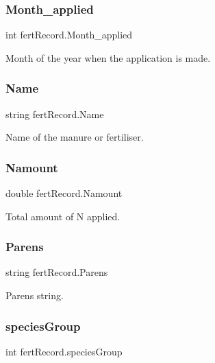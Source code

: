 \subsubsection{\texorpdfstring{Month\_applied}{Month\_applied}}
{\footnotesize\ttfamily int fert\+Record.\+Month\+\_\+applied}

Month of the year when the application is made. \mbox{\label{classfert_record_a04116c39447ca7dba821361c530b23f9}} 
\subsubsection{\texorpdfstring{Name}{Name}}
{\footnotesize\ttfamily string fert\+Record.\+Name}

Name of the manure or fertiliser. \mbox{\label{classfert_record_a60a97d66e846afeb5e5b6425d89b2427}} 
\subsubsection{\texorpdfstring{Namount}{Namount}}
{\footnotesize\ttfamily double fert\+Record.\+Namount}

Total amount of N applied. \mbox{\label{classfert_record_a4581cecf1c4f53b6809c7878c5ea75ff}} 
\subsubsection{\texorpdfstring{Parens}{Parens}}
{\footnotesize\ttfamily string fert\+Record.\+Parens}

Parens string. \mbox{\label{classfert_record_a771d65e534ff875346acaadb64052ae6}} 
\subsubsection{\texorpdfstring{speciesGroup}{speciesGroup}}
{\footnotesize\ttfamily int fert\+Record.\+species\+Group}

